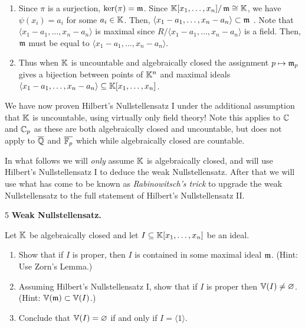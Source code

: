 \documentclass[Notebook.tex]{subfiles}
\begin{document}
\begin{solution}
\begin{enumerate}
        \item Since $\pi$ is a surjection, $\ker(\pi) = \operatorname{\mathfrak{m}}$. Since $\mathbb K[x_1, \ldots, x_n]/\operatorname{\mathfrak{m}} \cong \mathbb K$, we have $\psi(x_i) = a_i$ for some $a_i \in \mathbb K$. Then, $\langle x_1 - a_1, \ldots, x_n - a_n \rangle \subset \operatorname{\mathfrak{m}}$ . Note that $\langle x_1 - a_1, \ldots, x_n - a_n\rangle$ is maximal since $R/\langle x_1 - a_1, \ldots, x_n - a_n \rangle$ is a field. Then, $\operatorname{\mathfrak{m}}$ must be equal to $\langle x_1 - a_1, \ldots, x_n - a_n \rangle$. 
        
        \item Thus when $\mathbb K$ is uncountable and algebraically closed the assignment $p \mapsto \operatorname{\mathfrak{m}}_p$ gives a bijection between points of $\mathbb K^n$ and maximal ideals $\langle x_1 - a_1, \ldots, x_n - a_n \rangle \subseteq \mathbb K[x_1, \ldots, x_n]$. 
    \end{enumerate}
\end{solution}

\vspace{2em}

\hrulefill

We have now proven Hilbert's Nullstellensatz I under the additional assumption that $\mathbb K$ is uncountable, using virtually only field theory! Note this applies to $\mathbb C$ and $\mathbb C_{p}$ as these are both algebraically closed and uncountable, but does not apply to $\overline{\mathbb Q}$ and $\overline{\mathbb F_{p}}$ which while algebraically closed are countable. 

In what follows we will \emph{only} assume $\mathbb K$ is algebraically closed, and will use Hilbert's Nullstellensatz I to deduce the weak Nullstellensatz. After that we will use what has come to be known as \emph{Rabinowitsch's trick} to upgrade the weak Nullstellensatz to the full statement of Hilbert's Nullstellensatz II. 

\hrulefill

\newpage

\begin{problem}{5}
     \textbf{Weak Nullstellensatz.} 
     
    Let $\mathbb K$ be algebraically closed and let $I \subseteq \mathbb K[x_1,\ldots,x_n]$ be an ideal.
    \begin{enumerate}
        \item Show that if $I$ is proper, then $I$ is contained in some maximal ideal $\operatorname{\mathfrak{m}}$. (Hint: Use Zorn's Lemma.) 
        \item Assuming Hilbert's Nullstellensatz I, show that if  $I$ is proper then $\mathbb V(I) \neq \varnothing$. (Hint: $\mathbb V(\operatorname{\mathfrak{m}}) \subset \mathbb V(I)$.)
        \item Conclude that $\mathbb V(I) = \varnothing$ if and only if $I = \langle 1 \rangle$.
    \end{enumerate}
\end{problem}
\end{document}
